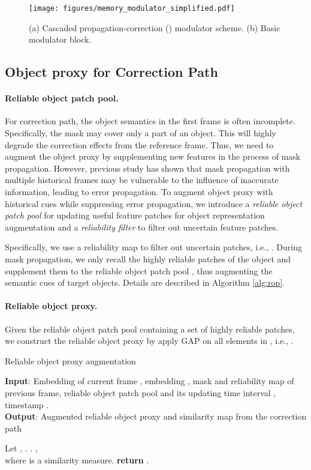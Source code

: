 \documentclass[letterpaper]{article} \usepackage{aaai22}  \usepackage{times}  \usepackage{helvet}  \usepackage{courier}  \usepackage[hyphens]{url}  \usepackage{graphicx} \urlstyle{rm} \def\UrlFont{\rm}  \usepackage{natbib}  \usepackage{caption} \DeclareCaptionStyle{ruled}{labelfont=normalfont,labelsep=colon,strut=off} \frenchspacing  \setlength{\pdfpagewidth}{8.5in}  \setlength{\pdfpageheight}{11in}  \usepackage{algorithm}
\begin{document}
\begin{figure}[t!]
		\centering
		\texttt{[image: figures/memory\_modulator\_simplified.pdf]}
		\caption{(a) Cascaded propagation-correction () modulator scheme. (b) Basic modulator block.}
		\label{fig:Mem_modu_simplified} 
\end{figure}	
 
\subsection{Object proxy for Correction Path}
\paragraph{Reliable object patch pool.}
For correction path, the object semantics in the first frame is often incomplete. Specifically, the mask may cover only a part of an object. This will highly degrade the correction effects from the reference frame.
Thus, we need to augment the object proxy by supplementing new features in the process of mask propagation. However, previous study \cite{wu2020memory} has shown that mask propagation with multiple historical frames may be vulnerable to the influence of inaccurate information, leading to error propagation. 
To augment object proxy with historical cues while suppressing error propagation, we introduce a \textit{reliable object patch pool} for updating useful feature patches for object representation augmentation and a \textit{reliability filter} to filter out uncertain feature patches.

Specifically, we use a reliability map  to filter out uncertain patches, i.e., . During mask propagation, we only recall the highly reliable patches of the object and supplement them to the reliable object patch pool , thus augmenting the semantic cues of target objects. Details are described in Algorithm \ref{alg:rop}.

\paragraph{Reliable object proxy.}
Given the reliable object patch pool  containing a set of highly reliable patches, we construct the reliable object proxy  by apply GAP on all elements in , i.e.,  .


\begin{algorithm}[tb]
\caption{Reliable object proxy augmentation}
\label{alg:rop}
\textbf{Input}: Embedding of current frame , embedding , mask  and reliability map  of previous frame, reliable object patch pool  and its updating time interval , timestamp . \\
\textbf{Output}: Augmented reliable object proxy  and similarity map from the correction path  
\begin{algorithmic}[1] \IF{}
\STATE Let , . 
\ENDIF
\IF{(}
\STATE  
\STATE . 
\ENDIF
\STATE 
\STATE , \\where  is a similarity measure.
\STATE \textbf{return} .
\end{algorithmic}
\end{algorithm}
\end{document}
